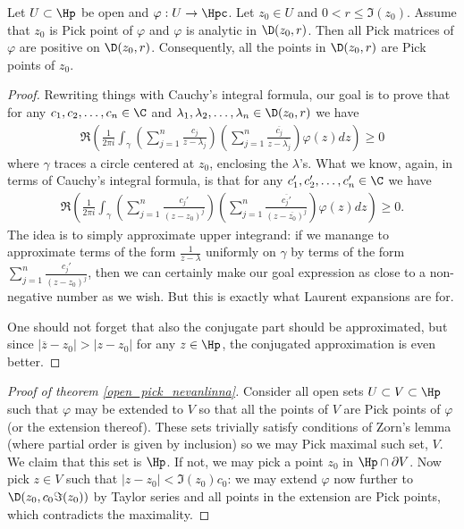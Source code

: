 \begin{lem}\label{pick_point_lemma}
	Let $U \subset \Hp$ be open and $\varphi : U \to \Hpc$. Let $z_{0} \in U$ and $0 < r \leq \Im(z_{0})$. Assume that $z_{0}$ is Pick point of $\varphi$ and $\varphi$ is analytic in $\D(z_{0}, r)$. Then all Pick matrices of $\varphi$ are positive on $\D(z_{0}, r)$. Consequently, all the points in $\D(z_{0}, r)$ are Pick points of $z_{0}$.
\end{lem}
\begin{proof}
	Rewriting things with Cauchy's integral formula, our goal is to prove that for any $c_{1}, c_{2}, \ldots, c_{n} \in \C$ and $\lambda_{1}, \lambda_{2}, \ldots, \lambda_{n} \in \D(z_{0}, r)$ we have
	\begin{align*}
		\Re\left(\frac{1}{2 \pi i} \int_{\gamma} \left(\sum_{j = 1}^{n} \frac{c_{j}}{z - \lambda_{j}}\right)\left(\sum_{j = 1}^{n} \frac{\overline{c_{j}}}{z - \overline{\lambda_{j}}}\right) \varphi(z) dz \right) \geq 0
	\end{align*}
	where $\gamma$ traces a circle centered at $z_{0}$, enclosing the $\lambda$'s. What we know, again, in terms of Cauchy's integral formula, is that for any $c_{1}', c_{2}', \ldots, c_{n}' \in \C$ we have
	\begin{align*}
		\Re\left(\frac{1}{2 \pi i} \int_{\gamma} \left(\sum_{j = 1}^{n} \frac{c_{j}'}{(z - z_{0})^{j}}\right) \left(\sum_{j = 1}^{n}\frac{\overline{c_{j}'}}{(z - \overline{z_{0}})^{j}}\right) \varphi(z) dz\right) \geq 0.
	\end{align*}
	The idea is to simply approximate upper integrand: if we manange to approximate terms of the form $\frac{1}{z - \lambda}$ uniformly on $\gamma$ by terms of the form $\sum_{j = 1}^{n} \frac{c_{j}'}{(z - z_{0})^{j}}$, then we can certainly make our goal expression as close to a non-negative number as we wish. But this is exactly what Laurent expansions are for.

	One should not forget that also the conjugate part should be approximated, but since $|\overline{z} - z_{0}| > |z - z_{0}|$ for any $z \in \Hp$, the conjugated approximation is even better.
\end{proof}

\begin{proof}[Proof of theorem \ref{open_pick_nevanlinna}]
	Consider all open sets $U \subset V \subset \Hp$ such that $\varphi$ may be extended to $V$ so that all the points of $V$ are Pick points of $\varphi$ (or the extension thereof). These sets trivially satisfy conditions of Zorn's lemma (where partial order is given by inclusion) so we may Pick maximal such set, $V$. We claim that this set is $\Hp$. If not, we may pick a point $z_{0}$ in $\Hp \cap \partial V$. Now pick $z \in V$ such that $|z - z_{0}| < \Im(z_{0}) c_{0}$: we may extend $\varphi$ now further to $\D(z_{0}, c_{0} \Im(z_{0}))$ by Taylor series and all points in the extension are Pick points, which contradicts the maximality.
\end{proof}

